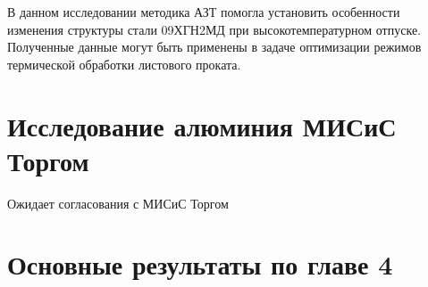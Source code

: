 В данном исследовании методика АЗТ помогла установить особенности изменения структуры стали 09ХГН2МД при высокотемпературном отпуске. Полученные данные могут быть применены в задаче оптимизации режимов термической обработки листового проката.

\FloatBarrier

\section{Исследование алюминия МИСиС Торгом}\label{sec:ch4/sect4}

Ожидает согласования с МИСиС Торгом

\FloatBarrier
\section{Основные результаты по главе 4}\label{sec:ch4/sect5}

\FloatBarrier
\clearpage










